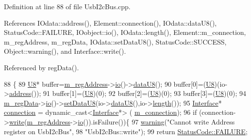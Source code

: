 Definition at line 88 of file Usb\+I2c\+Bus.\+cpp.



References I\+Odata\+::address(), Element\+::connection(), I\+Odata\+::data\+U8(), Status\+Code\+::\+F\+A\+I\+L\+U\+RE, I\+Oobject\+::io(), I\+Odata\+::length(), Element\+::m\+\_\+connection, m\+\_\+reg\+Address, m\+\_\+reg\+Data, I\+Odata\+::set\+Data\+U8(), Status\+Code\+::\+S\+U\+C\+C\+E\+SS, Object\+::warning(), and Interface\+::write().



Referenced by reg\+Data().


\begin{DoxyCode}
88                                      \{
89   \hyperlink{ICECALv3_8h_a3cb25ca6f51f003950f9625ff05536fc}{U8}* buffer=\hyperlink{classUsbI2cBus_ad109ed1599f94c84fb4469be8f0d174e}{m\_regAddress}->\hyperlink{classIOobject_af04fb94137c3d86849f478ac5afab5d1}{io}()->\hyperlink{classIOdata_a75e9c318dbac3a39402179070943d4bc}{dataU8}();
90   buffer[0]=(\hyperlink{classUsbI2cBus_a06be0e3e19b0f6eee34d3537bb31960e}{U8})(io->\hyperlink{classIOdata_afe410c86881b8c2082a08e5ce9843306}{address}());
91   buffer[1]=(\hyperlink{classUsbI2cBus_a06be0e3e19b0f6eee34d3537bb31960e}{U8})(0);
92   buffer[2]=(\hyperlink{classUsbI2cBus_a06be0e3e19b0f6eee34d3537bb31960e}{U8})(0);
93   buffer[3]=(\hyperlink{classUsbI2cBus_a06be0e3e19b0f6eee34d3537bb31960e}{U8})(0);
94   \hyperlink{classUsbI2cBus_afce60d99fce3a99d0d7d59d43a2f7ba5}{m\_regData}->\hyperlink{classIOobject_af04fb94137c3d86849f478ac5afab5d1}{io}()->\hyperlink{classIOdata_afece89b7035f6eec001cd397f07c062d}{setDataU8}(io->\hyperlink{classIOdata_a75e9c318dbac3a39402179070943d4bc}{dataU8}(),io->\hyperlink{classIOdata_abb40e71ce0290832a24857b4a1e7b1a3}{length}());
95   \hyperlink{classInterface}{Interface}* \hyperlink{classElement_af57444353c1ddf9fa0109801e97debf7}{connection} = \textcolor{keyword}{dynamic\_cast<}\hyperlink{classInterface}{Interface}*\textcolor{keyword}{>} (
      \hyperlink{classElement_abe3de7a5dbbc9a6dd2d7e012e5fdb266}{m\_connection});
96   \textcolor{keywordflow}{if} (connection->\hyperlink{classInterface_ad665cacbaf490a26c1c4ba192022e68a}{write}(\hyperlink{classUsbI2cBus_ad109ed1599f94c84fb4469be8f0d174e}{m\_regAddress}->\hyperlink{classIOobject_af04fb94137c3d86849f478ac5afab5d1}{io}()).isFailure())\{
97     \hyperlink{classObject_a65cd4fda577711660821fd2cd5a3b4c9}{warning}(\textcolor{stringliteral}{"Cannot write Address register on UsbI2cBus"},
98         \textcolor{stringliteral}{"UsbI2cBus::write"});
99     \textcolor{keywordflow}{return} \hyperlink{classStatusCode_a6f565cbeadc76d14c72f047e5e85eb4ba3da73d4c469762eb9d3c960368252b26}{StatusCode::FAILURE};

\end{DoxyCode}
